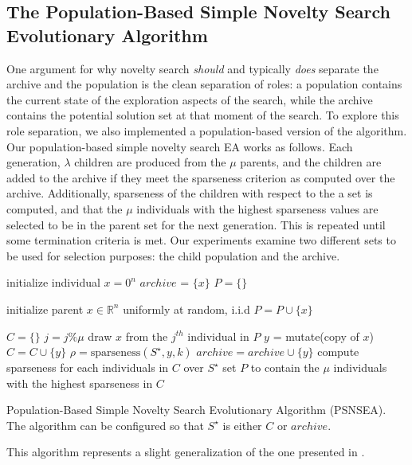 \documentclass[twoside]{article}
\newcommand{\IR}{\mathbb{R}}
\begin{document}
\subsection{The Population-Based Simple Novelty Search Evolutionary Algorithm}
\label{subsec:sns}
One argument for why novelty search \emph{should} and typically \emph{does} separate the archive and the population is the clean separation of roles:  a population contains the current state of the exploration aspects of the search, while the archive contains the potential solution set at that moment of the search.  To explore this role separation, we also implemented a population-based version of the algorithm.  Our population-based simple novelty search EA works as follows.  Each generation, $\lambda$ children are produced from the $\mu$ parents, and the children are added to the archive if they meet the sparseness criterion as computed over the archive.  Additionally, sparseness of the children with respect to the a set is computed, and that the $\mu$ individuals with the highest sparseness values are selected to be in the parent set for the next generation.  This is repeated until some termination criteria is met.  Our experiments examine two different sets to be used for selection purposes:  the child population and the archive.
%
\begin{algorithm}[h]
  \SetAlgoLined
  \DontPrintSemicolon 
  
  \;
    
  initialize individual $x = 0^n$\;
  $archive$ = $\{x\}$\;
  $P = \{\}$
  
   {
    initialize parent $x \in \IR^n$ uniformly at random, i.i.d\;
    $P = P \cup \{x\}$\;
   }
   
   {
    $C = \{\}$\;
     {
      $j = j \% \mu$\;
      draw $x$ from the $j^{th}$ individual in $P$\;
      $y$ = mutate(copy of $x$)\;
      $C = C \cup \{y\}$\;
      $\rho = \mbox{sparseness}(S^\star, y, k)$\;
       {
        $archive = archive \cup \{y\}$\;
        }
     }
    compute sparseness for each individuals in $C$ over $S^\star$\;
    set $P$ to contain the $\mu$ individuals with the highest sparseness in $C$\; 
  }
  \caption{Population-Based Simple Novelty Search Evolutionary Algorithm (PSNSEA).  The algorithm can be configured so that $S^\star$ is either $C$ or $archive$.}
\end{algorithm}
%
This algorithm represents a slight generalization of the one presented in \cite{Wiegand2021flairs}.
\end{document}

